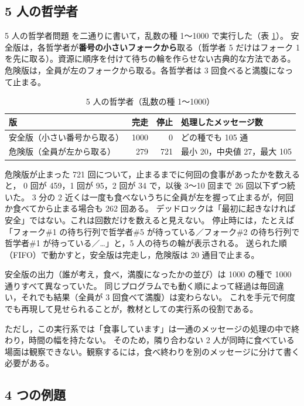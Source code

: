 \documentclass[a4paper,10pt]{ltjsarticle}
\begin{document}
\subsection{5 人の哲学者}

5 人の哲学者問題 \cite{dijkstra71} を二通りに書いて，乱数の種 1〜1000 で実行した（表 \ref{tab:phil}）。
安全版は，各哲学者が\textbf{番号の小さいフォークから}取る（哲学者 5 だけはフォーク 1 を先に取る）。資源に順序を付けて待ちの輪を作らせない古典的な方法である。
危険版は，全員が左のフォークから取る。各哲学者は 3 回食べると満腹になって止まる。

\begin{table}[t]
\centering\small
\caption{5 人の哲学者（乱数の種 1〜1000）}\label{tab:phil}
\begin{tabular}{@{}lrrl@{}}
\toprule
版 & 完走 & 停止 & 処理したメッセージ数 \\
\midrule
安全版（小さい番号から取る） & 1000 & 0 & どの種でも 105 通 \\
危険版（全員が左から取る） & 279 & 721 & 最小 20，中央値 27，最大 105 \\
\bottomrule
\end{tabular}
\end{table}

危険版が止まった 721 回について，止まるまでに何回の食事があったかを数えると，
0 回が 459，1 回が 95，2 回が 34 で，以後 3〜10 回まで 26 回以下ずつ続いた。
3 分の 2 近くは一度も食べないうちに全員が左を握って止まるが，何回か食べてから止まる場合も 262 回ある。
デッドロックは「最初に起きなければ安全」ではない。これは回数だけを数えると見えない。
停止時には，たとえば「フォーク\#1 の待ち行列で哲学者\#5 が待っている／フォーク\#2 の待ち行列で哲学者\#1 が待っている／…」と，5 人の待ちの輪が表示される。
送られた順（FIFO）で動かすと，安全版は完走し，危険版は 20 通目で止まる。

安全版の出力（誰が考え，食べ，満腹になったかの並び）は 1000 の種で 1000 通りすべて異なっていた。
同じプログラムでも動く順によって経過は毎回違い，それでも結果（全員が 3 回食べて満腹）は変わらない。
これを手元で何度でも再現して見せられることが，教材としての実行系の役割である。

ただし，この実行系では「食事しています」は一通のメッセージの処理の中で終わり，時間の幅を持たない。
そのため，隣り合わない 2 人が同時に食べている場面は観察できない。観察するには，食べ終わりを別のメッセージに分けて書く必要がある。

\subsection{4 つの例題}
\end{document}
